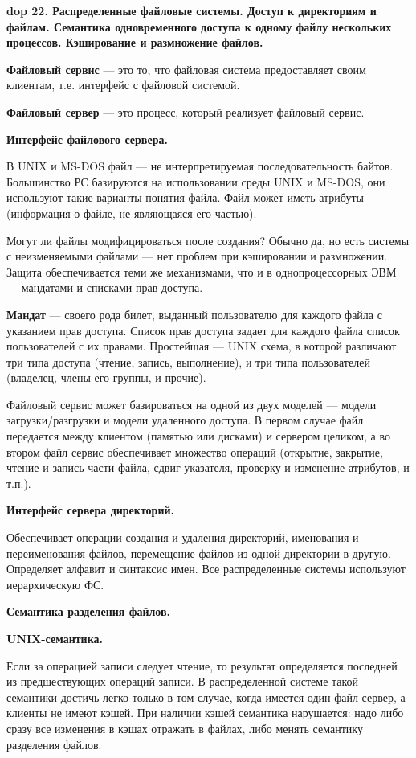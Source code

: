 \textbf{\LARGE dop 22. Распределенные файловые системы. Доступ к директориям и файлам. Семантика одновременного доступа к одному файлу нескольких процессов. Кэширование и размножение файлов.}

\textbf{Файловый сервис} --- это то, что файловая система предоставляет своим клиентам, т.е. интерфейс с файловой системой.

\textbf{Файловый сервер} --- это процесс, который реализует файловый сервис.

\textbf{Интерфейс файлового сервера.}

В UNIX и MS-DOS файл --- не интерпретируемая последовательность байтов.
Большинство РС базируются на использовании среды UNIX и MS-DOS, они используют такие варианты понятия файла. 
Файл может иметь атрибуты (информация о файле, не являющаяся его частью).

Могут ли файлы модифицироваться после создания? Обычно да, но есть системы с неизменяемыми файлами --- нет проблем при кэшировании и размножении. 
Защита обеспечивается теми же механизмами, что и в однопроцессорных ЭВМ --- мандатами и списками прав доступа. 

\textbf{Мандат} --- своего рода билет, выданный пользователю для каждого файла с указанием прав доступа. 
Список прав доступа задает для каждого файла список пользователей с их правами. 
Простейшая --- UNIX схема, в которой различают три типа доступа (чтение, запись, выполнение), и три типа пользователей (владелец, члены его группы, и прочие).

Файловый сервис может базироваться на одной из двух моделей --- модели загрузки/разгрузки и модели удаленного доступа. 
В первом случае файл передается между клиентом (памятью или дисками) и сервером целиком, а во втором файл сервис обеспечивает множество операций (открытие, закрытие, чтение и запись части файла, сдвиг указателя, проверку и изменение атрибутов, и т.п.).

\textbf{Интерфейс сервера директорий.}

Обеспечивает операции создания и удаления директорий, именования и переименования файлов, перемещение файлов из одной директории в другую. 
Определяет алфавит и синтаксис имен. 
Все распределенные системы используют иерархическую ФС.

\textbf{Семантика разделения файлов.}

\textbf{UNIX-семантика.}

Если за операцией записи следует чтение, то результат определяется последней из предшествующих операций записи. 
В распределенной системе такой семантики достичь легко только в том случае, когда имеется один файл-сервер, а клиенты не имеют кэшей. 
При наличии кэшей семантика нарушается: надо либо сразу все изменения в кэшах отражать в файлах, либо менять семантику разделения файлов. 

